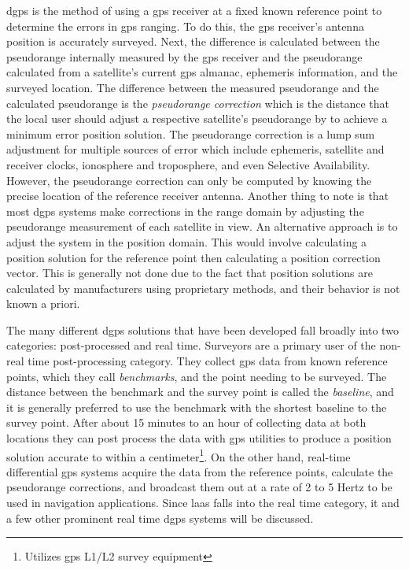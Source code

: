 \ac{dgps} is the method of using a \ac{gps} receiver at a fixed known reference point to determine the errors in \ac{gps} ranging. To do this, the \ac{gps} receiver's antenna position is accurately surveyed.  Next, the difference is calculated between the pseudorange internally measured by the \ac{gps} receiver and the pseudorange calculated from a satellite's current \ac{gps} almanac, ephemeris information, and the surveyed location.  The difference between the measured pseudorange and the calculated pseudorange is the \textit{pseudorange correction} which is the distance that the local user should adjust a respective satellite's pseudorange by to achieve a minimum error position solution. The pseudorange correction is a lump sum adjustment for multiple sources of error which include ephemeris, satellite and receiver clocks, ionosphere and troposphere, and even Selective Availability. However, the pseudorange correction can only be computed by knowing the precise location of the reference receiver antenna. Another thing to note is that most \ac{dgps} systems make corrections in the range domain by adjusting the pseudorange measurement of each satellite in view.  An alternative approach is to adjust the system in the position domain.  This would involve calculating a position solution for the reference point then calculating a position correction vector.  This is generally not done due to the fact that position solutions are calculated by manufacturers using proprietary methods, and their behavior is not known a priori.

The many different \ac{dgps} solutions that have been developed fall broadly into two categories: post-processed and real time. Surveyors are a primary user of the non-real time post-processing category.  They collect \ac{gps} data from known reference points, which they call \textit{benchmarks}, and the point needing to be surveyed.  The distance between the benchmark and the survey point is called the \textit{baseline}, and it is generally preferred to use the benchmark with the shortest baseline to the survey point. After about 15 minutes to an hour of collecting data at both locations they can post process the data with \ac{gps} utilities to produce a position solution accurate to within a centimeter\footnote{Utilizes \ac{gps} L1/L2 survey equipment}.  On the other hand, real-time differential \ac{gps} systems acquire the data from the reference points, calculate the pseudorange corrections, and broadcast them out at a rate of 2 to 5 Hertz to be used in navigation applications. Since \ac{laas} falls into the real time category, it and a few other prominent real time \ac{dgps} systems will be discussed.

